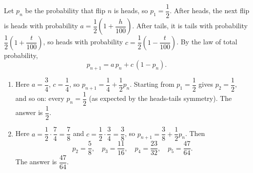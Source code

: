 Let \(p_n\) be the probability that flip \(n\) is heads, so \(p_1=\dfrac{1}{2}\). After heads, the next flip is heads with probability \(a=\dfrac{1}{2}\left(1+\dfrac{h}{100}\right)\). After tails, it is tails with probability \(\dfrac{1}{2}\left(1+\dfrac{t}{100}\right)\), so heads with probability \(c=\dfrac{1}{2}\left(1-\dfrac{t}{100}\right)\). By the law of total probability,
\[
p_{n+1}=a\,p_n+c\,(1-p_n).
\]
\begin{enumerate}
\item[(a)] Here \(a=\dfrac{3}{4}\), \(c=\dfrac{1}{4}\), so \(p_{n+1}=\dfrac{1}{4}+\dfrac{1}{2}p_n\). Starting from \(p_1=\dfrac{1}{2}\) gives \(p_2=\dfrac{1}{2}\), and so on: every \(p_n=\dfrac{1}{2}\) (as expected by the heads-tails symmetry). The answer is \(\boxed{\dfrac{1}{2}}\).
\item[(b)] Here \(a=\dfrac{1}{2}\cdot\dfrac{7}{4}=\dfrac{7}{8}\) and \(c=\dfrac{1}{2}\cdot\dfrac{3}{4}=\dfrac{3}{8}\), so \(p_{n+1}=\dfrac{3}{8}+\dfrac{1}{2}p_n\). Then
\[
p_2=\dfrac{5}{8},\quad p_3=\dfrac{11}{16},\quad p_4=\dfrac{23}{32},\quad p_5=\dfrac{47}{64}.
\]
The answer is \(\boxed{\dfrac{47}{64}}\).
\end{enumerate}
